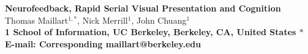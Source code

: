 \documentclass[12pt]{article}
\date{}
\begin{document}
\begin{flushleft}
{\Large
\textbf{Neurofeedback, Rapid Serial Visual Presentation and Cognition}
}
\\
Thomas Maillart$^{1,\ast}$, 
Nick Merrill$^{1}$, 
John Chuang$^{1}$
\\
\bf{1} School of Information, UC Berkeley, Berkeley, CA, United States
$\ast$ E-mail: Corresponding maillart@berkeley.edu
\end{flushleft}













%
%
%
%


\end{document}
